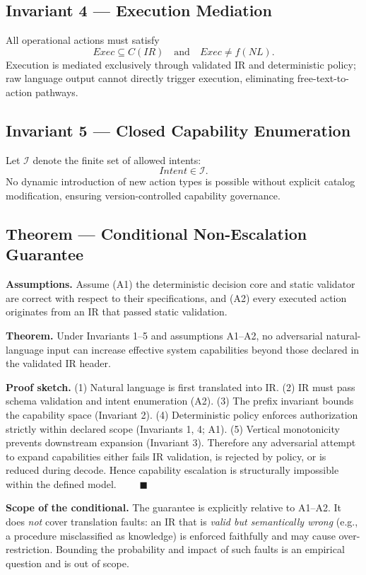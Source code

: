 \documentclass[conference]{IEEEtran}
\begin{document}
\subsection{Invariant 4 --- Execution Mediation}
All operational actions must satisfy
\[
\mathit{Exec} \subseteq C(IR) \quad\text{and}\quad \mathit{Exec} \neq
f(NL).
\]
Execution is mediated exclusively through validated IR and deterministic
policy; raw language output cannot directly trigger execution, eliminating
free-text-to-action pathways.

\subsection{Invariant 5 --- Closed Capability Enumeration}
Let $\mathcal{I}$ denote the finite set of allowed intents:
\[
\mathit{Intent} \in \mathcal{I}.
\]
No dynamic introduction of new action types is possible without explicit
catalog modification, ensuring version-controlled capability governance.

\subsection{Theorem --- Conditional Non-Escalation Guarantee}
\textbf{Assumptions.} Assume (A1) the deterministic decision core and
static validator are correct with respect to their specifications, and
(A2) every executed action originates from an IR that passed static
validation.

\textbf{Theorem.} Under Invariants 1--5 and assumptions A1--A2, no
adversarial natural-language input can increase effective system
capabilities beyond those declared in the validated IR header.

\textbf{Proof sketch.}
(1) Natural language is first translated into IR.
(2) IR must pass schema validation and intent enumeration (A2).
(3) The prefix invariant bounds the capability space (Invariant 2).
(4) Deterministic policy enforces authorization strictly within declared
scope (Invariants 1, 4; A1).
(5) Vertical monotonicity prevents downstream expansion (Invariant 3).
Therefore any adversarial attempt to expand capabilities either fails IR
validation, is rejected by policy, or is reduced during decode. Hence
capability escalation is structurally impossible within the defined
model. $\qquad\blacksquare$

\textbf{Scope of the conditional.} The guarantee is explicitly relative to
A1--A2. It does \emph{not} cover translation faults: an IR that is
\emph{valid but semantically wrong} (e.g., a procedure misclassified as
knowledge) is enforced faithfully and may cause over-restriction. Bounding
the probability and impact of such faults is an empirical question and is
out of scope.
\end{document}
